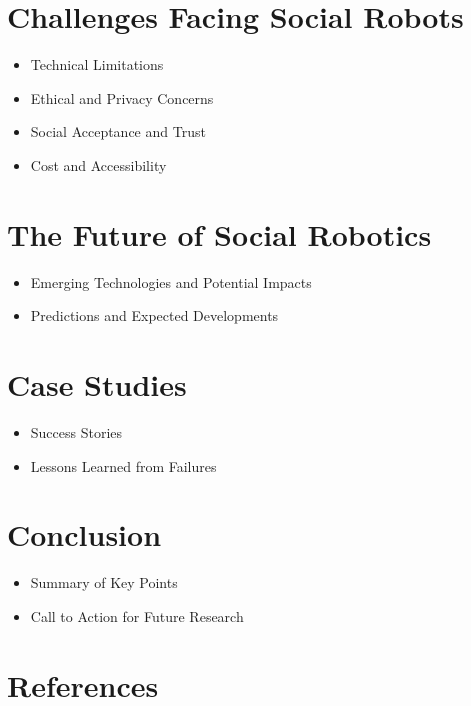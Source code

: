 \documentclass{article}
\begin{document}
\section{Challenges Facing Social Robots}
\begin{itemize}
    \item Technical Limitations
    \item Ethical and Privacy Concerns
    \item Social Acceptance and Trust
    \item Cost and Accessibility
\end{itemize}

\section{The Future of Social Robotics}
\begin{itemize}
    \item Emerging Technologies and Potential Impacts
    \item Predictions and Expected Developments
\end{itemize}

\section{Case Studies}
\begin{itemize}
    \item Success Stories
    \item Lessons Learned from Failures
\end{itemize}

\section{Conclusion}
\begin{itemize}
    \item Summary of Key Points
    \item Call to Action for Future Research
\end{itemize}

\section{References}
\end{document}
